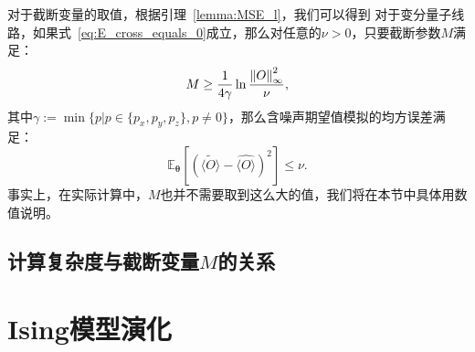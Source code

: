 对于截断变量的取值，根据引理~\ref{lemma:MSE_l}，我们可以得到
对于变分量子线路，如果式~\eqref{eq:E_cross_equals_0}成立，那么对任意的$\nu > 0$，只要截断参数$M$满足：
\begin{equation}
    M\geq\frac{1}{4\gamma}\ln{\frac{\norm{O}_\infty^2}{\nu}},
\end{equation}
其中$\gamma:=\min\{p|{p \in \{p_x,p_y,p_z\},p\neq 0}\}$，那么含噪声期望值模拟的均方误差满足：
\begin{equation}
    \mathbb{E}_{\bm{\theta}}\left[\left(\widetilde{\langle O\rangle}-\widehat{\langle O\rangle}\right)^2\right]\leq\nu.
\end{equation}
事实上，在实际计算中，$M$也并不需要取到这么大的值，我们将在本节中具体用数值说明。

\subsection{计算复杂度与截断变量$M$的关系}




\section{Ising模型演化}